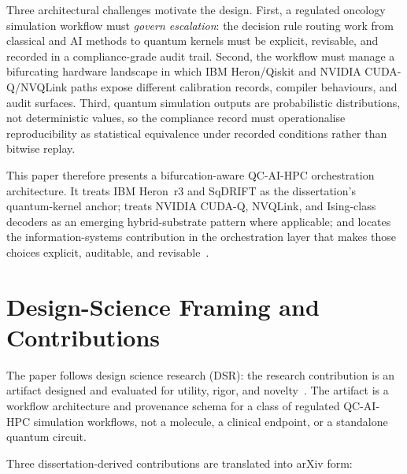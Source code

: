 \documentclass[11pt,letterpaper]{article}
\begin{document}
Three architectural challenges motivate the design.  First, a regulated oncology simulation
workflow must \emph{govern escalation}: the decision rule routing work from classical and AI
methods to quantum kernels must be explicit, revisable, and recorded in a compliance-grade
audit trail.  Second, the workflow must manage a bifurcating hardware landscape in which
IBM Heron/Qiskit and NVIDIA CUDA-Q/NVQLink paths expose different calibration records,
compiler behaviours, and audit surfaces.  Third, quantum simulation outputs are
probabilistic distributions, not deterministic values, so the compliance record must
operationalise reproducibility as statistical equivalence under recorded conditions rather
than bitwise replay.

This paper therefore presents a bifurcation-aware QC-AI-HPC orchestration architecture.
It treats IBM Heron~r3 and SqDRIFT as the dissertation's quantum-kernel anchor; treats NVIDIA
CUDA-Q, NVQLink, and Ising-class decoders as an emerging hybrid-substrate pattern where
applicable; and locates the information-systems contribution in the orchestration layer that
makes those choices explicit, auditable, and revisable~\cite{heron2026ibm,ising2026nvidia,cudaqec2026}.

\section{Design-Science Framing and Contributions}

The paper follows design science research (DSR): the research contribution is an artifact
designed and evaluated for utility, rigor, and novelty~\cite{hevner2004,peffers2007}.  The
artifact is a workflow architecture and provenance schema for a class of regulated
QC-AI-HPC simulation workflows, not a molecule, a clinical endpoint, or a standalone quantum
circuit.

Three dissertation-derived contributions are translated into arXiv form:
\end{document}

